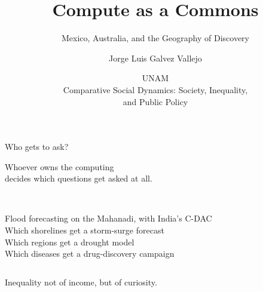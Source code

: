 \documentclass[aspectratio=169]{beamer}
\title{Compute as a Commons}
\subtitle{Mexico, Australia, and the Geography of Discovery}
\author{Jorge Luis Galvez Vallejo}
\institute{National Computational Infrastructure (NCI),\\ Australia}
\date{UNAM \textbullet{}\\ Comparative Social Dynamics: Society, Inequality,\\ and Public Policy}
\begin{document}
\maketitle

\begin{frame}{Who gets to ask?}
\begin{center}
{\Large Whoever owns the computing\\[2pt] decides \alert{which questions get asked at all.}}
\end{center}
\vspace{1.2em}
\begin{columns}[T]
\\[2pt]\small Flood forecasting on the Mahanadi, with India's C-DAC
\\[2pt]\small Which shorelines get a storm-surge forecast
\\[2pt]\small Which regions get a drought model
\\[2pt]\small Which diseases get a drug-discovery campaign
\end{columns}
\vspace{1.2em}
\begin{center}\color{cookieMuted}Inequality not of income, but of \alert{curiosity}.\end{center}
\end{frame}
\end{document}
